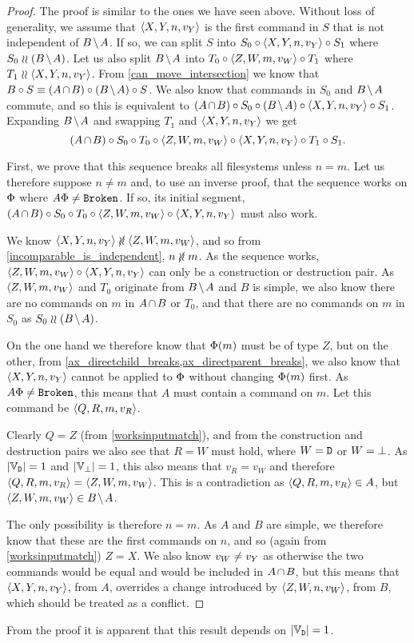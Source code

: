\begin{proof}
The proof is similar to the ones we have seen above.
Without loss of generality, we assume that $\langle{X,Y,n,v_Y}\rangle$ is the first command in $S$
that is not independent of $\bmanp$.
If so, we can split $S$ into $S_0\circ\langle{X,Y,n,v_Y}\rangle\circ S_1$ where $S_0\indep\bma$.
Let us also split $\bmanp$ into $T_0\circ\langle{Z,W,m,v_W}\rangle\circ T_1$ where $T_1\mathrel{\wr\wr}\langle{X,Y,n,v_Y}\rangle$.
From \cref{can_move_intersection} we know that
$B\cc S \equiv \acb\cc\bma\cc S$.
We also know that commands in $S_0$ and $\bmanp$ commute, and so this is equivalent to
$\acb\cc S_0\cc\bma\cc\cxynv\cc S_1$.
Expanding $\bmanp$ and swapping $T_1$ and $\langle{X,Y,n,v_Y}\rangle$ we get
\[ (A\nobreak\hspace{-1pt plus 1pt}\nobreak\cap\nobreak\hspace{-1pt plus 1pt}\nobreak B)\circ S_0\circ T_0 \circ \langle{Z,W,m,v_W}\rangle \circ \langle{X,Y,n,v_Y}\rangle\circ T_1\circ S_1. \]

First, we prove that this sequence breaks all filesystems
unless $n=m$.
Let us therefore suppose $n\neq m$ and, to use an inverse proof,
that the sequence works on $\Phi$ where $A\Phi\neq\mathtt{Broken}$.
If so, its initial segment, $(A\nobreak\hspace{-1pt plus 1pt}\nobreak\cap\nobreak\hspace{-1pt plus 1pt}\nobreak B)\circ S_0\circ T_0 \circ \langle{Z,W,m,v_W}\rangle \circ \langle{X,Y,n,v_Y}\rangle$ must also work.

We know $\cxynv\nindep\czwmv$, and so from \cref{incomparable_is_independent}, $n\nunrel m$.
As the sequence works, $\langle{Z,W,m,v_W}\rangle\circ\langle{X,Y,n,v_Y}\rangle$ can only be a construction or destruction pair.
As $\langle{Z,W,m,v_W}\rangle$ and $T_0$ originate from $\bmanp$ and $B$ is simple, we also know there are
no commands on $m$ in $\acbnp$ or $T_0$,
and that there are no commands on $m$ in $S_0$ as $S_0\indep\bma$.

On the one hand we therefore know that $\Phi(m)$ must be of type $Z$,
but on the other, from \cref{ax_directchild_breaks,ax_directparent_breaks},
we also know that $\langle{X,Y,n,v_Y}\rangle$ cannot be applied to $\Phi$ without
changing $\Phi(m)$ first.
As $A\Phi\neq\mathtt{Broken}$, this means that $A$ must contain a command on $m$.
Let this command be $\langle{Q,R,m,v_R}\rangle$.

Clearly $Q=Z$ (from \cref{worksinputmatch}), and from the construction and destruction
pairs we also see that $R=W$ must hold, where $W=\mathtt{D}$ or $W=\bot$.
As $|\mathbb{V}_{\mathtt{D}}|=1$ and $|\mathbb{V}_{\bot}|=1$, this also means that $v_R=v_W$ and therefore
$\langle{Q,R,m,v_R}\rangle = \langle{Z,W,m,v_W}\rangle$.
This is a contradiction as $\langle{Q,R,m,v_R}\rangle\in A$, but $\czwmv\in\bmanp$.

The only possibility is therefore $n=m$.
As $A$ and $B$ are simple, we therefore know that these are the first commands on $n$,
and so (again from \cref{worksinputmatch}) $Z=X$.
We also know $v_W\neq v_Y$ as otherwise the two commands would be equal and
would be included in $\acbnp$,
but this means that $\langle{X,Y,n,v_Y}\rangle$, from $A$, overrides a change introduced 
by $\langle{Z,W,n,v_W}\rangle$, from $B$, which should be treated as a conflict.
\end{proof}

From the proof it is apparent that this result depends on $|\mathbb{V}_{\mathtt{D}}|=1$.

